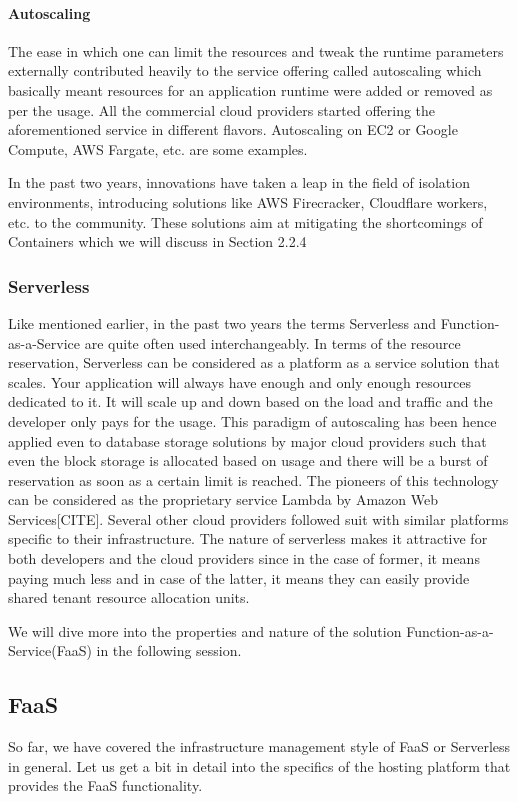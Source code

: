 \documentclass[12pt,titlepage]{article}
\begin{document}
\paragraph{Autoscaling}
\label{sec:org6b27923}
The ease in which one can limit the resources and tweak the runtime parameters externally contributed heavily
to the service offering called autoscaling which basically meant resources for an
application runtime were added or removed as per the usage. All the commercial
cloud providers started offering the aforementioned service in different
flavors. Autoscaling on EC2 or Google Compute, AWS Fargate, etc. are some examples.

In the past two years, innovations have taken a leap in the field of isolation
environments, introducing solutions like AWS Firecracker, Cloudflare workers,
etc. to the community. These solutions aim at mitigating the shortcomings of
Containers which we will discuss in Section 2.2.4

\subsubsection{Serverless}
\label{sec:orgfd0b44f}
Like mentioned earlier, in the past two years the terms Serverless and Function-as-a-Service are quite
often used interchangeably. In terms of the resource reservation, Serverless can
be considered as a platform as a service solution that scales. Your application
will always have enough and only enough resources dedicated to it. It will scale
up and down based on the load and traffic and the developer only pays for the usage.
This paradigm of autoscaling has been hence applied even to database storage
solutions by major cloud providers such that even the block storage is allocated
based on usage and there will be a burst of reservation as soon as a certain
limit is reached.
The pioneers of this technology can be considered as the proprietary service
Lambda by Amazon Web Services[CITE]. Several other cloud providers followed suit
with similar platforms specific to their infrastructure.
The nature of serverless makes it attractive for both developers and the cloud
providers since in the case of former, it means paying much less and in case of
the latter, it means they can easily provide shared tenant resource allocation
units.

We will dive more into the properties and nature of the solution
Function-as-a-Service(FaaS) in the following session. 

\subsection{FaaS}
\label{sec:org7a4422a}
So far, we have covered the infrastructure management style of FaaS or
Serverless in general. Let us get a bit in detail into the specifics of the
hosting platform that provides the FaaS functionality.
\end{document}
